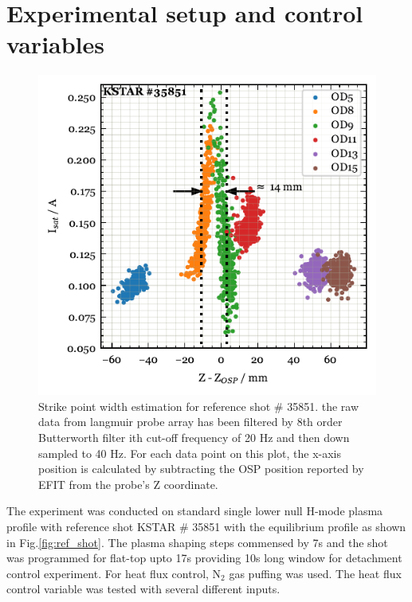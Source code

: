 \section{Experimental setup and control variables}
\label{sec:control_variables}

\begin{figure}[!ht]
 \centering
 \includegraphics[width=\linewidth]{figures/StrikePointWidth.pdf}
 \caption{
Strike point width estimation for reference shot \# 35851.
the raw data from langmuir probe array has been filtered by 8th order Butterworth filter ith cut-off frequency of 20 Hz and then down sampled to 40 Hz.
For each data point on this plot, the x-axis position is calculated by subtracting the \ac{OSP} position reported by EFIT from the probe's Z coordinate.
}
 \label{fig:strike_point_width}
\end{figure}

The experiment was conducted on standard single lower null H-mode plasma profile with reference shot KSTAR \# 35851 with the equilibrium profile as shown in Fig.\ref{fig:ref_shot}.
The plasma shaping steps commensed by 7s and the shot was programmed for flat-top upto 17s providing 10s long window for detachment control experiment.
For heat flux control, N$_2$ gas puffing was used.
The heat flux control variable was tested with several different inputs.

